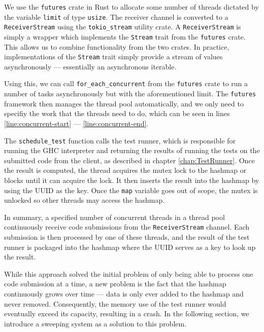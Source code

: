 We use the \texttt{futures} crate in Rust to allocate some number of threads dictated by the variable \texttt{limit} of type \texttt{usize}.
The receiver channel is converted to a \texttt{ReceiverStream} using the \texttt{tokio\_stream} utility crate.
A \texttt{ReceiverStream} is simply a wrapper which implements the \texttt{Stream} trait from the \texttt{futures} crate.
This allows us to combine functionality from the two crates.
In practice, implementations of the \texttt{Stream} trait simply provide a stream of values asynchronously --- essentially an asynchronous iterable.

Using this, we can call \texttt{for\_each\_concurrent} from the \texttt{futures} crate to run a number of tasks asynchronously but with the aforementioned limit.
The \texttt{futures} framework then manages the thread pool automatically, and we only need to specifiy the work that the threads need to do, which can be seen in lines \ref{line:concurrent-start} --- \ref{line:concurrent-end}.

The \texttt{schedule\_test} function calls the test runner, which is responsible for running the GHC interpreter and returning the results of running the tests on the submitted code from the client, as described in chapter \ref{chap:TestRunner}.
Once the result is computed, the thread acquires the mutex lock to the hashmap or blocks until it can acquire the lock.
It then inserts the result into the hashmap by using the UUID as the key.
Once the \texttt{map} variable goes out of scope, the mutex is unlocked so other threads may access the hashmap.

In summary, a specified number of concurrent threads in a thread pool continuously receive code submissions from the \texttt{ReceiverStream} channel.
Each submission is then processed by one of these threads, and the result of the test runner is packaged into the hashmap where the UUID serves as a key to look up the result.

While this approach solved the initial problem of only being able to process one code submission at a time, a new problem is the fact that the hashmap continuously grows over time --- data is only ever added to the hashmap and never removed.
Consequently, the memory use of the test runner would eventually exceed its capacity, resulting in a crash.
In the following section, we introduce a sweeping system as a solution to this problem.

